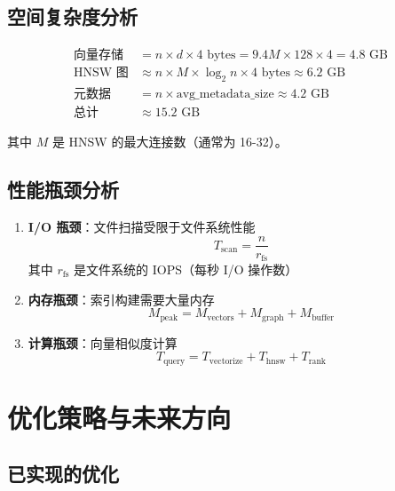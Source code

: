 \documentclass[12pt,a4paper]{article}
\begin{document}
\subsection{空间复杂度分析}

\begin{align}
\text{向量存储} &= n \times d \times 4 \text{ bytes} = 9.4M \times 128 \times 4 = 4.8 \text{ GB} \\
\text{HNSW 图} &\approx n \times M \times \log_2 n \times 4 \text{ bytes} \approx 6.2 \text{ GB} \\
\text{元数据} &= n \times \text{avg\_metadata\_size} \approx 4.2 \text{ GB} \\
\text{总计} &\approx 15.2 \text{ GB}
\end{align}

其中 $M$ 是 HNSW 的最大连接数（通常为 16-32）。

\subsection{性能瓶颈分析}

\begin{enumerate}
    \item \textbf{I/O 瓶颈}：文件扫描受限于文件系统性能
    \begin{equation}
    T_{\text{scan}} = \frac{n}{r_{\text{fs}}}
    \end{equation}
    其中 $r_{\text{fs}}$ 是文件系统的 IOPS（每秒 I/O 操作数）

    \item \textbf{内存瓶颈}：索引构建需要大量内存
    \begin{equation}
    M_{\text{peak}} = M_{\text{vectors}} + M_{\text{graph}} + M_{\text{buffer}}
    \end{equation}

    \item \textbf{计算瓶颈}：向量相似度计算
    \begin{equation}
    T_{\text{query}} = T_{\text{vectorize}} + T_{\text{hnsw}} + T_{\text{rank}}
    \end{equation}
\end{enumerate}

\section{优化策略与未来方向}

\subsection{已实现的优化}
\end{document}
